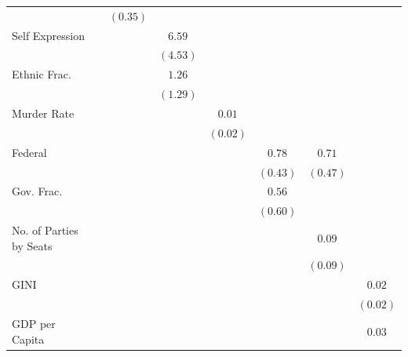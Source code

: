 \documentclass[a4paper]{article}\usepackage[]{graphicx}\usepackage[]{color}
\begin{document}
\begin{table}
\begin{center}
\begin{tabular}{l c c c c c c c }
                        &               & $(0.35)$     &              &             &              &              &             \\
Self Expression         &               &              & $6.59$       &             &              &              &             \\
                        &               &              & $(4.53)$     &             &              &              &             \\
Ethnic Frac.            &               &              & $1.26$       &             &              &              &             \\
                        &               &              & $(1.29)$     &             &              &              &             \\
Murder Rate             &               &              &              & $0.01$      &              &              &             \\
                        &               &              &              & $(0.02)$    &              &              &             \\
Federal                 &               &              &              &             & $0.78$       & $0.71$       &             \\
                        &               &              &              &             & $(0.43)$     & $(0.47)$     &             \\
Gov. Frac.              &               &              &              &             & $0.56$       &              &             \\
                        &               &              &              &             & $(0.60)$     &              &             \\
No. of Parties by Seats &               &              &              &             &              & $0.09$       &             \\
                        &               &              &              &             &              & $(0.09)$     &             \\
GINI                    &               &              &              &             &              &              & $0.02$      \\
                        &               &              &              &             &              &              & $(0.02)$    \\
GDP per Capita          &               &              &              &             &              &              & $0.03$      \\

\end{tabular}
\end{center}
\end{table}
\end{document}
